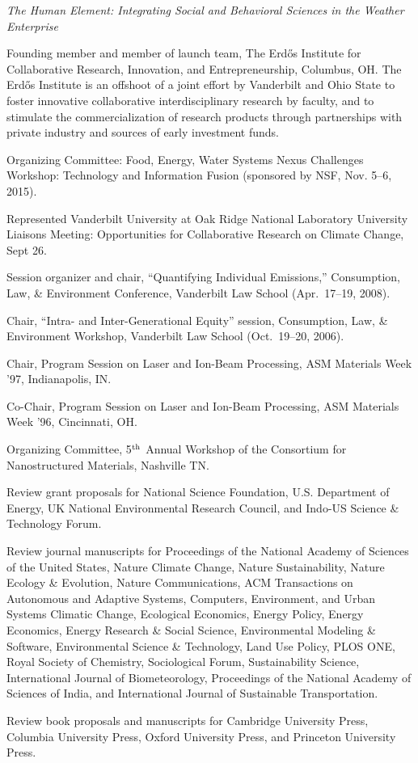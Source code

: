   \emph{The Human Element: Integrating Social and Behavioral Sciences in the
    Weather Enterprise}
\item[2017] Founding member and member of launch team,
  The Erd\H{o}s Institute for Collaborative Research, Innovation, and
  Entrepreneurship, Columbus, OH.
  The Erd\H{o}s Institute is an offshoot of a joint effort by Vanderbilt and
  Ohio State to foster innovative collaborative interdisciplinary research by
  faculty, and to stimulate the commercialization of research products through
  partnerships with private industry and sources of early investment funds.
\item[2015] Organizing Committee:
  Food, Energy, Water Systems Nexus Challenges Workshop: Technology and
  Information Fusion (sponsored by NSF, Nov. 5--6, 2015).
\item[2007] Represented Vanderbilt University at Oak Ridge National Laboratory
  University Liaisons Meeting: Opportunities for Collaborative Research on
  Climate Change, Sept 26.
\item[2008] Session organizer and chair, ``Quantifying Individual Emissions,''
  Consumption, Law, \& Environment Conference, Vanderbilt Law School
  (Apr.\ 17--19, 2008).
\item[2006] Chair, ``Intra- and Inter-Generational Equity'' session,
  Consumption, Law, \& Environment Workshop, Vanderbilt Law School
  (Oct.~19--20, 2006).
\item[1997] Chair, Program Session on Laser and Ion-Beam Processing,
  ASM Materials Week '97, In\-di\-an\-a\-po\-lis, IN.
\item[1996] Co-Chair, Program Session on Laser and Ion-Beam Processing,
  ASM Materials Week '96, Cincinnati, OH.
\item[1996] Organizing Committee,
   5$^{\mbox{\scriptsize th}}$ Annual Workshop of the Consortium for
   Nanostructured Materials, Nashville TN.
\item[Ongoing] Review grant proposals for National Science Foundation,
  U.S. Department of Energy, UK National Environmental Research Council,
  and Indo-US Science \& Technology Forum.
\item[Ongoing] Review journal manuscripts for
  Proceedings of the National Academy of Sciences of the United States,
  Nature Climate Change,
  Nature Sustainability,
  Nature Ecology \& Evolution,
  Nature Communications,
  ACM Transactions on Autonomous and Adaptive Systems,
  Computers, Environment, and Urban Systems
  Climatic Change,
  Ecological Economics,
  Energy Policy,
  Energy Economics,
  Energy Research \& Social Science,
  Environmental Modeling \& Software,
  Environmental Science \& Technology,
  Land Use Policy,
  PLOS ONE,
  Royal Society of Chemistry,
  Sociological Forum,
  Sustainability Science,
  International Journal of Biometeorology,
  Proceedings of the National Academy of Sciences of India,
  and
  International Journal of Sustainable Transportation.
\item[Ongoing] Review book proposals and manuscripts for
  Cambridge University Press,
  Columbia University Press,
  Oxford University Press,
  and Princeton University Press.
